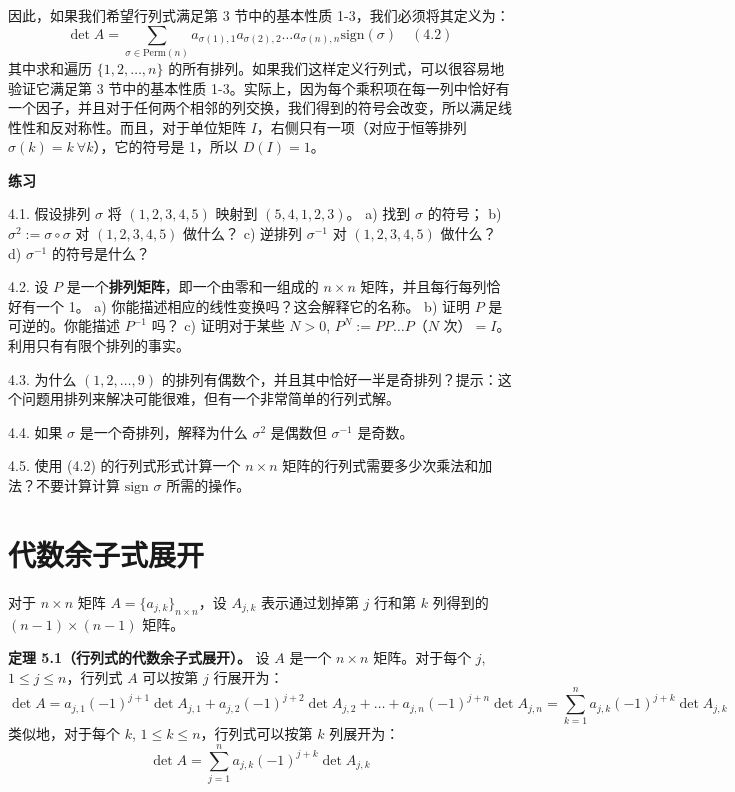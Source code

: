 因此，如果我们希望行列式满足第 3 节中的基本性质 1-3，我们必须将其定义为：
$$
\det A = \sum_{\sigma \in \text{Perm}(n)} a_{\sigma(1),1} a_{\sigma(2),2} \dots a_{\sigma(n),n} \text{sign}(\sigma) \quad (4.2)
$$
其中求和遍历 $\{1, 2, \dots, n\}$ 的所有排列。如果我们这样定义行列式，可以很容易地验证它满足第 3 节中的基本性质 1-3。实际上，因为每个乘积项在每一列中恰好有一个因子，并且对于任何两个相邻的列交换，我们得到的符号会改变，所以满足线性性和反对称性。而且，对于单位矩阵 $I$，右侧只有一项（对应于恒等排列 $\sigma(k)=k \ \forall k$），它的符号是 1，所以 $D(I)=1$。

\textbf{练习}~

4.1. 假设排列 $\sigma$ 将 $(1, 2, 3, 4, 5)$ 映射到 $(5, 4, 1, 2, 3)$。
a) 找到 $\sigma$ 的符号；
b) $\sigma^2 := \sigma \circ \sigma$ 对 $(1, 2, 3, 4, 5)$ 做什么？
c) 逆排列 $\sigma^{-1}$ 对 $(1, 2, 3, 4, 5)$ 做什么？
d) $\sigma^{-1}$ 的符号是什么？

4.2. 设 $P$ 是一个\textbf{排列矩阵}，即一个由零和一组成的 $n \times n$ 矩阵，并且每行每列恰好有一个 1。
a) 你能描述相应的线性变换吗？这会解释它的名称。
b) 证明 $P$ 是可逆的。你能描述 $P^{-1}$ 吗？
c) 证明对于某些 $N > 0$, $P^N := P P \dots P$（$N$ 次）$= I$。利用只有有限个排列的事实。

4.3. 为什么 $(1, 2, \dots, 9)$ 的排列有偶数个，并且其中恰好一半是奇排列？提示：这个问题用排列来解决可能很难，但有一个非常简单的行列式解。

4.4. 如果 $\sigma$ 是一个奇排列，解释为什么 $\sigma^2$ 是偶数但 $\sigma^{-1}$ 是奇数。

4.5. 使用 (4.2) 的行列式形式计算一个 $n \times n$ 矩阵的行列式需要多少次乘法和加法？不要计算计算 $\text{sign } \sigma$ 所需的操作。


\section{代数余子式展开}

对于 $n \times n$ 矩阵 $A = \{a_{j,k}\}_{n \times n}$，设 $A_{j,k}$ 表示通过划掉第 $j$ 行和第 $k$ 列得到的 $(n-1) \times (n-1)$ 矩阵。

\textbf{定理 5.1（行列式的代数余子式展开）。} 设 $A$ 是一个 $n \times n$ 矩阵。对于每个 $j$, $1 \le j \le n$，行列式 $A$ 可以按第 $j$ 行展开为：
$$
\det A = a_{j,1} (-1)^{j+1} \det A_{j,1} + a_{j,2} (-1)^{j+2} \det A_{j,2} + \dots + a_{j,n} (-1)^{j+n} \det A_{j,n} = \sum_{k=1}^n a_{j,k} (-1)^{j+k} \det A_{j,k}
$$
类似地，对于每个 $k$, $1 \le k \le n$，行列式可以按第 $k$ 列展开为：
$$
\det A = \sum_{j=1}^n a_{j,k} (-1)^{j+k} \det A_{j,k}
$$

